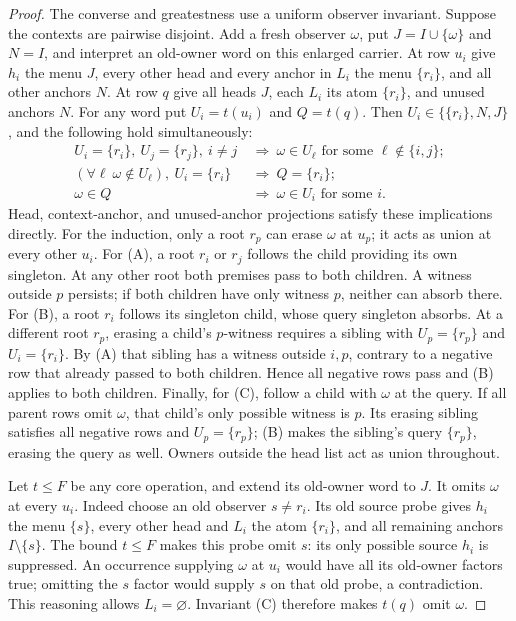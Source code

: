 \begin{proof}
The converse and greatestness use a uniform observer invariant.
Suppose the contexts are pairwise disjoint. Add a fresh observer
$\omega$, put $J=I\cup\{\omega\}$ and $N=I$, and interpret an
old-owner word on this enlarged carrier.
At row $u_i$ give $h_i$ the menu $J$, every other head and every
anchor in $L_i$ the menu $\{r_i\}$, and all other anchors $N$.
At row $q$ give all heads $J$, each $L_i$ its atom $\{r_i\}$, and
unused anchors $N$. For any word put $U_i=t(u_i)$ and $Q=t(q)$.
Then $U_i\in\{\{r_i\},N,J\}$, and the following hold simultaneously:
\begin{align}
 U_i=\{r_i\},\ U_j=\{r_j\},\ i\ne j
 &\ \Longrightarrow\ \omega\in U_\ell
       \text{ for some }\ell\notin\{i,j\};\tag{A}\label{core:eq:head-invariant-a}\\
 (\forall\ell\ \omega\notin U_\ell),\ U_i=\{r_i\}
 &\ \Longrightarrow\ Q=\{r_i\};\tag{B}\label{core:eq:head-invariant-b}\\
 \omega\in Q&\ \Longrightarrow\ \omega\in U_i
       \text{ for some }i.\tag{C}\label{core:eq:head-invariant-c}
\end{align}
Head, context-anchor, and unused-anchor projections satisfy these
implications directly. For the induction, only a root $r_p$ can erase
$\omega$ at $u_p$; it acts as union at every other $u_i$.
For (A), a root $r_i$ or $r_j$ follows the child providing its own
singleton. At any other root both premises pass to both children.
A witness outside $p$ persists; if both children have only witness $p$,
neither can absorb there. For (B), a root $r_i$ follows its singleton
child, whose query singleton absorbs. At a different root $r_p$,
erasing a child's $p$-witness requires a sibling with $U_p=\{r_p\}$
and $U_i=\{r_i\}$. By (A) that sibling has a witness outside $i,p$,
contrary to a negative row that already passed to both children.
Hence all negative rows pass and (B) applies to both children.
Finally, for (C), follow a child with $\omega$ at the query. If all
parent rows omit $\omega$, that child's only possible witness is $p$.
Its erasing sibling satisfies all negative rows and $U_p=\{r_p\}$;
(B) makes the sibling's query $\{r_p\}$, erasing the query as well.
Owners outside the head list act as union throughout.

Let $t\leq F$ be any core operation, and extend its old-owner word to
$J$. It omits $\omega$ at every $u_i$. Indeed choose an old observer
$s\ne r_i$. Its old source probe gives $h_i$ the menu $\{s\}$,
every other head and $L_i$ the atom $\{r_i\}$, and all remaining
anchors $I\setminus\{s\}$. The bound $t\leq F$ makes this probe
omit $s$: its only possible source $h_i$ is suppressed. An occurrence
supplying $\omega$ at $u_i$ would have all its old-owner factors true;
omitting the $s$ factor would supply $s$ on that old probe, a
contradiction. This reasoning allows $L_i=\varnothing$. Invariant (C)
therefore makes $t(q)$ omit $\omega$.


\end{proof}
